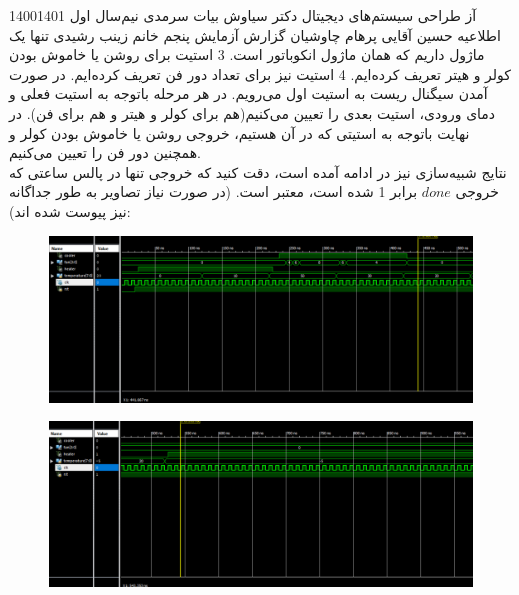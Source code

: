\documentclass[a4paper,12pt]{article}
\begin{document}
\handout
{آز طراحی سیستم‌های دیجیتال}
{دکتر سیاوش بیات سرمدی}
{نیم‌سال اول 1400\lr{-}1401}
{اطلاعیه}
{ \newline حسین آقایی \newline پرهام چاوشیان}
{  }
 {گزارش آزمایش پنجم}
{خانم زینب رشیدی}
تنها یک ماژول داریم که همان ماژول انکوباتور است. 3 استیت برای روشن یا خاموش بودن کولر و هیتر تعریف کرده‌ایم. 4 استیت نیز برای تعداد دور فن تعریف کرده‌ایم. در صورت آمدن سیگنال ریست به استیت اول می‌رویم. در هر مرحله باتوجه به استیت فعلی و دمای ورودی، استیت بعدی را تعیین می‌کنیم(هم برای کولر و هیتر و هم برای فن). در نهایت باتوجه به استیتی که در آن هستیم، خروجی روشن یا خاموش بودن کولر و همچنین دور فن را تعیین می‌کنیم.\\
نتایج شبیه‌سازی نیز در ادامه آمده است، دقت کنید که خروجی تنها در پالس ساعتی که خروجی $done$ برابر 1 شده است، معتبر است. (در صورت نیاز تصاویر به طور جداگانه نیز پیوست شده اند):
\begin{figure}[H]
 \centering
  \includegraphics[width=0.8\linewidth]{s1}
\end{figure}
\begin{figure}[H]
 \centering
  \includegraphics[width=0.8\linewidth]{s2}
\end{figure}
\end{document}
